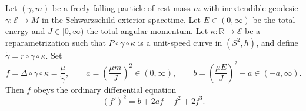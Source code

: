Let $(\gamma, m)$ be a freely falling particle of rest-mass $m$ with inextendible geodesic $\gamma: \mathcal{E} \to M$ in the Schwarzschild exterior spacetime. Let $E \in (0, \infty)$ be the total energy and $J \in [0, \infty)$ the total angular momentum. Let $\kappa: \mathbb{R} \to \mathcal{E}$ be a reparametrization such that $P \circ \gamma \circ \kappa$ is a unit-speed curve in $(S^2, h)$, and define $\tilde{\gamma} = r \circ \gamma \circ \kappa$. Set
$$
f = \Delta \circ \gamma \circ \kappa = \frac{\mu}{\tilde{\gamma}}, \qquad
a = \left( \frac{\mu m}{J} \right)^2 \in (0, \infty), \qquad
b = \left( \frac{\mu E}{J} \right)^2 - a \in (-a, \infty).
$$
Then $f$ obeys the ordinary differential equation
$$
(f')^2 = b + 2a f - f^2 + 2f^3.
$$

